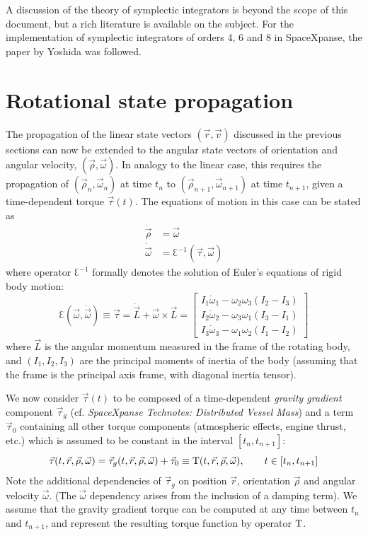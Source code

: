 \documentclass[a4paper]{article}
\begin{document}
A discussion of the theory of symplectic integrators is beyond the scope of this document, but a rich literature is available on the subject. For the implementation of symplectic integrators of orders 4, 6 and 8 in SpaceXpanse, the paper by Yoshida \cite{yoshida1990} was followed.

\section{Rotational state propagation}
The propagation of the linear state vectors $(\vec{r},\vec{v})$ discussed in the previous sections can now be extended to the angular state vectors of orientation and angular velocity, $(\vec{\rho},\vec{\omega})$. In analogy to the linear case, this requires the propagation of $(\vec{\rho}_n,\vec{\omega}_n)$ at time $t_n$ to $(\vec{\rho}_{n+1},\vec{\omega}_{n+1})$ at time $t_{n+1}$, given a time-dependent torque $\vec{\tau}(t)$.
The equations of motion in this case can be stated as
\begin{equation}
\begin{split}
\dot{\vec{\rho}} &= \vec\omega \\
\dot{\vec{\omega}} &= \Euler^{-1}(\vec\tau,\vec\omega)
\end{split}
\end{equation}
where operator $\Euler^{-1}$ formally denotes the solution of Euler's equations of rigid body motion:
\begin{equation}
\Euler(\vec\omega,\dot{\vec\omega}) \equiv \vec\tau = 
\dot{\vec{L}}+\vec\omega \times \vec{L} =
\left[
\begin{array}{ccc}
I_1\dot\omega_1 - \omega_2\omega_3(I_2-I_3) \\
I_2\dot\omega_2 - \omega_3\omega_1(I_3-I_1) \\
I_3\dot\omega_3 - \omega_1\omega_2(I_1-I_2)
\end{array}
\right]
\end{equation}
where $\vec{L}$ is the angular momentum measured in the frame of the rotating body, and $(I_1,I_2,I_3)$ are the principal moments of inertia of the body (assuming that the frame is the principal axis frame, with diagonal inertia tensor).

We now consider $\vec\tau(t)$ to be composed of a time-dependent \emph{gravity gradient} component $\vec\tau_g$ (cf. \emph{SpaceXpanse Technotes: Distributed Vessel Mass}) and a term $\vec\tau_0$ containing all other torque components (atmospheric effects, engine thrust, etc.) which is assumed to be constant in the interval $[t_n, t_{n+1}]$:
\begin{equation}
\vec\tau(t,\vec{r},\vec\rho,\vec\omega) = \vec\tau_g(t,\vec{r},\vec\rho,\vec\omega) + \vec\tau_0 \equiv \mathrm{T}(t,\vec{r},\vec\rho,\vec\omega), \qquad t \in [t_n, t_{n+1}]
\end{equation}
Note the additional dependencies of $\vec\tau_g$ on position $\vec{r}$, orientation $\vec\rho$ and angular velocity $\vec\omega$. (The $\vec\omega$ dependency arises from the inclusion of a damping term).
We assume that the gravity gradient torque can be computed at any time between $t_n$ and $t_{n+1}$, and represent the resulting torque function by operator $\mathrm{T}$.
\end{document}
